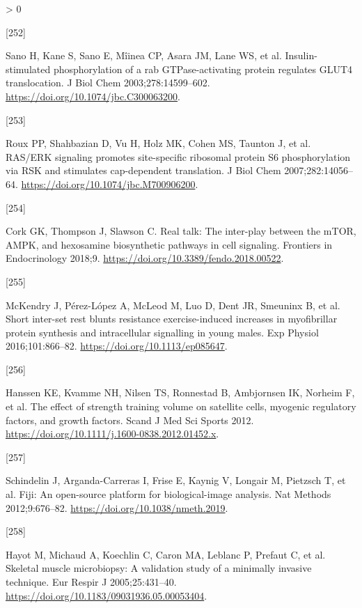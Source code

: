 \documentclass[twoside,10pt]{gihclass} %
\newlength{\cslhangindent}
\newlength{\csllabelwidth}
\newenvironment{CSLReferences}[3] %
 {%
  \setlength{\parindent}{0pt}
  \ifodd #1 \everypar{\setlength{\hangindent}{\cslhangindent}}\ignorespaces\fi
  \ifnum #2 > 0
  \setlength{\parskip}{#2\baselineskip}
  \fi
 }%
 {}
\newcommand{\CSLLeftMargin}[1]{\parbox[t]{\maxof{\widthof{#1}}{\csllabelwidth}}{#1}}
\newcommand{\CSLRightInline}[1]{\parbox[t]{\linewidth}{#1}}
\begin{document}
\begin{CSLReferences}{0}{0}
\leavevmode\hypertarget{ref-RN2856}{}%
\CSLLeftMargin{{[}252{]} }
\CSLRightInline{Sano H, Kane S, Sano E, Mîinea CP, Asara JM, Lane WS, et al. Insulin-stimulated phosphorylation of a rab GTPase-activating protein regulates GLUT4 translocation. J Biol Chem 2003;278:14599--602. \url{https://doi.org/10.1074/jbc.C300063200}.}

\leavevmode\hypertarget{ref-RN2311}{}%
\CSLLeftMargin{{[}253{]} }
\CSLRightInline{Roux PP, Shahbazian D, Vu H, Holz MK, Cohen MS, Taunton J, et al. RAS/ERK signaling promotes site-specific ribosomal protein S6 phosphorylation via RSK and stimulates cap-dependent translation. J Biol Chem 2007;282:14056--64. \url{https://doi.org/10.1074/jbc.M700906200}.}

\leavevmode\hypertarget{ref-RN2858}{}%
\CSLLeftMargin{{[}254{]} }
\CSLRightInline{Cork GK, Thompson J, Slawson C. Real talk: The inter-play between the mTOR, AMPK, and hexosamine biosynthetic pathways in cell signaling. Frontiers in Endocrinology 2018;9. \url{https://doi.org/10.3389/fendo.2018.00522}.}

\leavevmode\hypertarget{ref-RN2857}{}%
\CSLLeftMargin{{[}255{]} }
\CSLRightInline{McKendry J, Pérez-López A, McLeod M, Luo D, Dent JR, Smeuninx B, et al. Short inter-set rest blunts resistance exercise-induced increases in myofibrillar protein synthesis and intracellular signalling in young males. Exp Physiol 2016;101:866--82. \url{https://doi.org/10.1113/ep085647}.}

\leavevmode\hypertarget{ref-RN796}{}%
\CSLLeftMargin{{[}256{]} }
\CSLRightInline{Hanssen KE, Kvamme NH, Nilsen TS, Ronnestad B, Ambjornsen IK, Norheim F, et al. The effect of strength training volume on satellite cells, myogenic regulatory factors, and growth factors. Scand J Med Sci Sports 2012. \url{https://doi.org/10.1111/j.1600-0838.2012.01452.x}.}

\leavevmode\hypertarget{ref-RN2561}{}%
\CSLLeftMargin{{[}257{]} }
\CSLRightInline{Schindelin J, Arganda-Carreras I, Frise E, Kaynig V, Longair M, Pietzsch T, et al. Fiji: An open-source platform for biological-image analysis. Nat Methods 2012;9:676--82. \url{https://doi.org/10.1038/nmeth.2019}.}

\leavevmode\hypertarget{ref-RN824}{}%
\CSLLeftMargin{{[}258{]} }
\CSLRightInline{Hayot M, Michaud A, Koechlin C, Caron MA, Leblanc P, Prefaut C, et al. Skeletal muscle microbiopsy: A validation study of a minimally invasive technique. Eur Respir J 2005;25:431--40. \url{https://doi.org/10.1183/09031936.05.00053404}.}


\end{CSLReferences}
\end{document}
